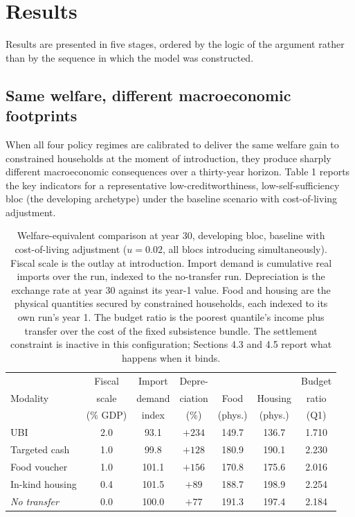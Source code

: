 \documentclass[preprint,review,12pt]{elsarticle}
\begin{document}
\section{Results}

Results are presented in five stages, ordered by the logic of the
argument rather than by the sequence in which the model was constructed.

\subsection{Same welfare, different macroeconomic footprints}

When all four policy regimes are calibrated to deliver the same welfare
gain to constrained households at the moment of introduction, they
produce sharply different macroeconomic consequences over a thirty-year
horizon. Table 1 reports the key indicators for a representative
low-creditworthiness, low-self-sufficiency bloc (the developing
archetype) under the baseline scenario with cost-of-living adjustment.

\begin{table}[htbp]
\centering
\caption{Welfare-equivalent comparison at year 30, developing bloc,
baseline with cost-of-living adjustment ($u = 0.02$, all blocs
introducing simultaneously). Fiscal scale is the outlay at introduction.
Import demand is cumulative real imports over the run, indexed to the
no-transfer run. Depreciation is the exchange rate at year 30 against its
year-1 value. Food and housing are the physical quantities secured by
constrained households, each indexed to its own run's year 1. The budget
ratio is the poorest quantile's income plus transfer over the cost of the
fixed subsistence bundle. The settlement constraint is inactive in this
configuration; Sections 4.3 and 4.5 report what happens when it binds.}
\label{tab:same-welfare}
\setlength{\tabcolsep}{5pt}
\begin{tabular}{lcccccc}
\hline
         & Fiscal  & Import  & Depre-   &        &         & Budget \\
Modality & scale   & demand  & ciation  & Food   & Housing & ratio  \\
         & (\% GDP) & index  & (\%)     & (phys.) & (phys.) & (Q1)   \\
\hline
UBI                  & 2.0 & 93.1  & $+234$ & 149.7 & 136.7 & 1.710 \\
Targeted cash        & 1.0 & 99.8  & $+128$ & 180.9 & 190.1 & 2.230 \\
Food voucher         & 1.0 & 101.1 & $+156$ & 170.8 & 175.6 & 2.016 \\
In-kind housing      & 0.4 & 101.5 & $+89$  & 188.7 & 198.9 & 2.254 \\
\hline
\textit{No transfer} & 0.0 & 100.0 & $+77$  & 191.3 & 197.4 & 2.184 \\
\hline
\end{tabular}
\end{table}
\end{document}

